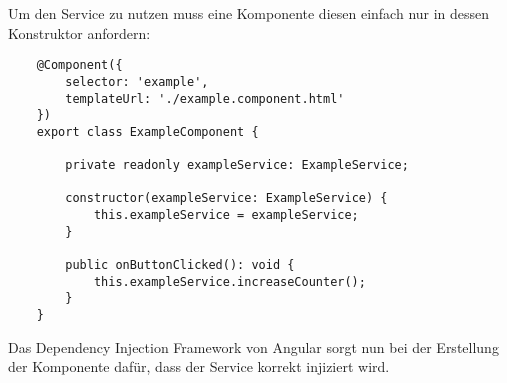 Um den Service zu nutzen muss eine Komponente diesen einfach nur in dessen Konstruktor anfordern:

\begin{verbatim}
    @Component({
        selector: 'example',
        templateUrl: './example.component.html'
    })
    export class ExampleComponent {

        private readonly exampleService: ExampleService;

        constructor(exampleService: ExampleService) {
            this.exampleService = exampleService;
        }

        public onButtonClicked(): void {
            this.exampleService.increaseCounter();
        }
    }
\end{verbatim}

Das Dependency Injection Framework von Angular sorgt nun bei der Erstellung der Komponente dafür, dass der Service korrekt injiziert wird.